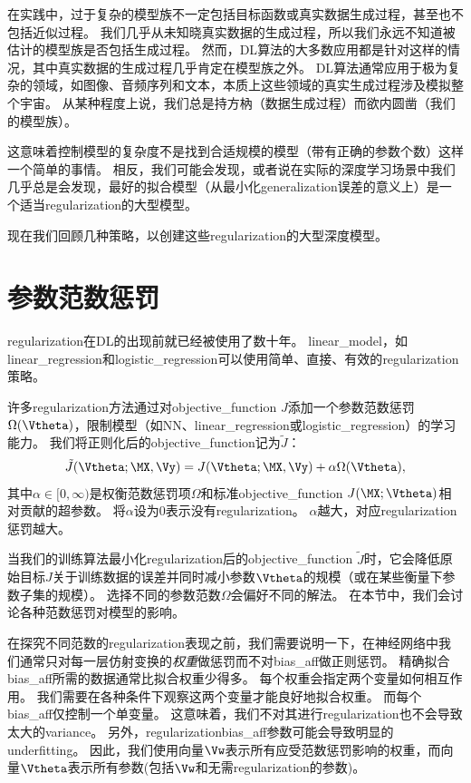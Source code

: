 在实践中，过于复杂的模型族不一定包括目标函数或真实数据生成过程，甚至也不包括近似过程。
我们几乎从未知晓真实数据的生成过程，所以我们永远不知道被估计的模型族是否包括生成过程。
然而，\gls{DL}算法的大多数应用都是针对这样的情况，其中真实数据的生成过程几乎肯定在模型族之外。
\gls{DL}算法通常应用于极为复杂的领域，如图像、音频序列和文本，本质上这些领域的真实生成过程涉及模拟整个宇宙。
从某种程度上说，我们总是持方枘（数据生成过程）而欲内圆凿（我们的模型族）。

这意味着控制模型的复杂度不是找到合适规模的模型（带有正确的参数个数）这样一个简单的事情。
相反，我们可能会发现，或者说在实际的深度学习场景中我们几乎总是会发现，最好的拟合模型（从最小化\gls{generalization}误差的意义上）是一个适当\gls{regularization}的大型模型。

现在我们回顾几种策略，以创建这些\gls{regularization}的大型深度模型。


\section{参数范数惩罚}
\label{sec:parameter_norm_penalties}
\gls{regularization}在\gls{DL}的出现前就已经被使用了数十年。
\gls{linear_model}，如\gls{linear_regression}和\gls{logistic_regression}可以使用简单、直接、有效的\gls{regularization}策略。

许多\gls{regularization}方法通过对\gls{objective_function} $J$添加一个参数范数惩罚$\Omega(\Vtheta)$，限制模型（如\gls{NN}、\gls{linear_regression}或\gls{logistic_regression}）的学习能力。
我们将正则化后的\gls{objective_function}记为$\tilde{J}$：
\begin{align}
 \tilde{J}(\Vtheta;\MX, \Vy) = J(\Vtheta;\MX, \Vy) + \alpha \Omega(\Vtheta),
\end{align}
其中$\alpha \in [0, \infty)$是权衡范数惩罚项$\Omega$和标准\gls{objective_function} $J(\MX;\Vtheta)$相对贡献的超参数。
将$\alpha$设为0表示没有\gls{regularization}。
$\alpha$越大，对应\gls{regularization}惩罚越大。

当我们的训练算法最小化\gls{regularization}后的\gls{objective_function} $\tilde{J}$时，它会降低原始目标$J$关于训练数据的误差并同时减小参数$\Vtheta$的规模（或在某些衡量下参数子集的规模）。
选择不同的参数范数$\Omega$会偏好不同的解法。
在本节中，我们会讨论各种范数惩罚对模型的影响。

在探究不同范数的\gls{regularization}表现之前，我们需要说明一下，在神经网络中我们通常只对每一层仿射变换的\emph{权重}做惩罚而不对\gls{bias_aff}做正则惩罚。
精确拟合\gls{bias_aff}所需的数据通常比拟合权重少得多。
每个权重会指定两个变量如何相互作用。
我们需要在各种条件下观察这两个变量才能良好地拟合权重。
而每个\gls{bias_aff}仅控制一个单变量。
这意味着，我们不对其进行\gls{regularization}也不会导致太大的\gls{variance}。
另外，\gls{regularization}\gls{bias_aff}参数可能会导致明显的\gls{underfitting}。
因此，我们使用向量$\Vw$表示所有应受范数惩罚影响的权重，而向量$\Vtheta$表示所有参数(包括$\Vw$和无需\gls{regularization}的参数)。

